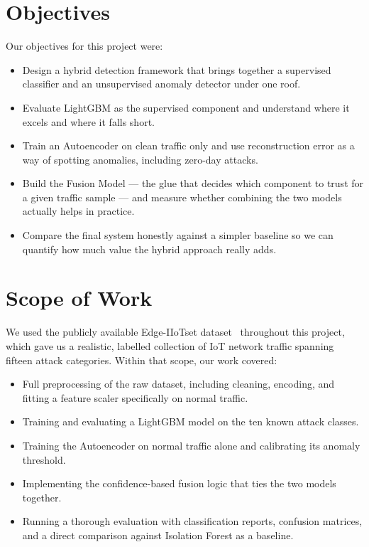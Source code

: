\documentclass[12pt,a4paper]{report}
\begin{document}
\section{Objectives}

Our objectives for this project were:
\begin{itemize}
  \item Design a hybrid detection framework that brings together a supervised
        classifier and an unsupervised anomaly detector under one roof.
  \item Evaluate LightGBM as the supervised component and understand where it
        excels and where it falls short.
  \item Train an Autoencoder on clean traffic only and use reconstruction error
        as a way of spotting anomalies, including zero-day attacks.
  \item Build the Fusion Model — the glue that decides which component to trust
        for a given traffic sample — and measure whether combining the two
        models actually helps in practice.
  \item Compare the final system honestly against a simpler baseline so we can
        quantify how much value the hybrid approach really adds.
\end{itemize}

\section{Scope of Work}

We used the publicly available Edge-IIoTset dataset~\cite{dataset_edge_iiotset}
throughout this project, which gave us a realistic, labelled collection of IoT
network traffic spanning fifteen attack categories. Within that scope, our work
covered:
\begin{itemize}
  \item Full preprocessing of the raw dataset, including cleaning, encoding,
        and fitting a feature scaler specifically on normal traffic.
  \item Training and evaluating a LightGBM model on the ten known attack classes.
  \item Training the Autoencoder on normal traffic alone and calibrating its
        anomaly threshold.
  \item Implementing the confidence-based fusion logic that ties the two models together.
  \item Running a thorough evaluation with classification reports, confusion matrices,
        and a direct comparison against Isolation Forest as a baseline.
\end{itemize}
\end{document}
